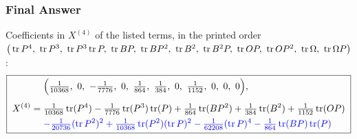 \subsubsection*{Final Answer}


\noindent Coefficients in $X^{(4)}$ of the listed terms, in the printed order
$\big(\tr P^4,\ \tr P^3,\ \tr P^3\tr P,\ \tr BP,\ \tr BP^2,\ \tr B^2,\ \tr B^2P,\ \tr OP,\ \tr OP^2,\ \tr\Omega,\ \tr\Omega P\big)$:
\begin{equation*}
\boxed{\;
\begin{aligned}
&\Big(\tfrac{1}{10368},\ 0,\ -\tfrac{1}{7776},\ 0,\ \tfrac{1}{864},\ \tfrac{1}{384},\ 0,\ \tfrac{1}{1152},\ 0,\ 0,\ 0\Big),\\[4pt]
X^{(4)}=\;&\tfrac{1}{10368}\tr(P^4)-\tfrac{1}{7776}\tr(P^3)\tr(P)+\tfrac{1}{864}\tr(BP^2)+\tfrac{1}{384}\tr(B^2)+\tfrac{1}{1152}\tr(OP)\\
&\chg{-\tfrac{1}{20736}(\tr P^2)^2+\tfrac{1}{10368}\tr(P^2)(\tr P)^2-\tfrac{1}{62208}(\tr P)^4-\tfrac{1}{864}\tr(BP)\tr(P)}
\end{aligned}\;}
\end{equation*}